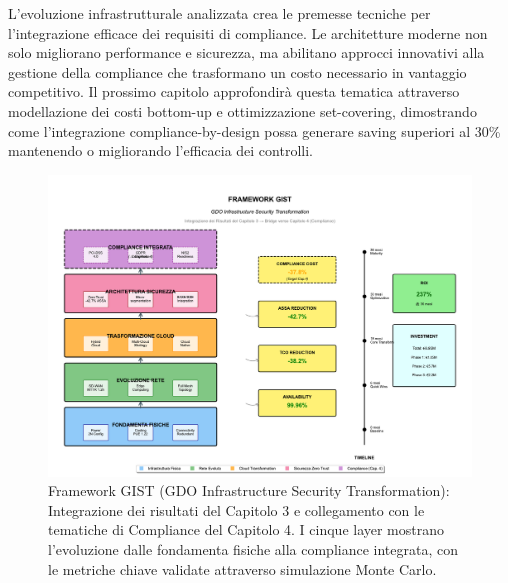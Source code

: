 L'evoluzione infrastrutturale analizzata crea le premesse tecniche per l'integrazione efficace dei requisiti di compliance. Le architetture moderne non solo migliorano performance e sicurezza, ma abilitano approcci innovativi alla gestione della compliance che trasformano un costo necessario in vantaggio competitivo. Il prossimo capitolo approfondirà questa tematica attraverso modellazione dei costi bottom-up e ottimizzazione set-covering, dimostrando come l'integrazione compliance-by-design possa generare saving superiori al 30\% mantenendo o migliorando l'efficacia dei controlli.
\begin{figure}[htbp]
\centering
\includegraphics[width=\textwidth]{thesis_figures/cap3/figura_3_6_framework_integrato.pdf}
\caption{Framework GIST (GDO Infrastructure Security Transformation): 
         Integrazione dei risultati del Capitolo 3 e collegamento con 
         le tematiche di Compliance del Capitolo 4. I cinque layer mostrano 
         l'evoluzione dalle fondamenta fisiche alla compliance integrata, 
         con le metriche chiave validate attraverso simulazione Monte Carlo.}
\label{fig:framework_gist}
\end{figure}
